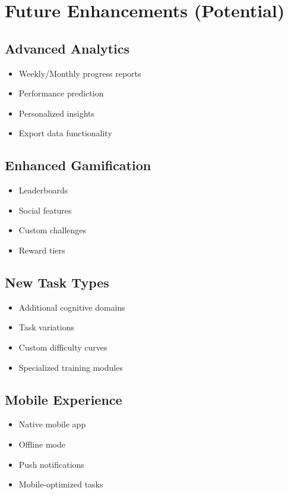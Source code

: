 \documentclass[12pt,a4paper]{article}
\begin{document}
\section{Future Enhancements (Potential)}

\subsection{Advanced Analytics}
\begin{itemize}
    \item Weekly/Monthly progress reports
    \item Performance prediction
    \item Personalized insights
    \item Export data functionality
\end{itemize}

\subsection{Enhanced Gamification}
\begin{itemize}
    \item Leaderboards
    \item Social features
    \item Custom challenges
    \item Reward tiers
\end{itemize}

\subsection{New Task Types}
\begin{itemize}
    \item Additional cognitive domains
    \item Task variations
    \item Custom difficulty curves
    \item Specialized training modules
\end{itemize}

\subsection{Mobile Experience}
\begin{itemize}
    \item Native mobile app
    \item Offline mode
    \item Push notifications
    \item Mobile-optimized tasks
\end{itemize}
\end{document}
